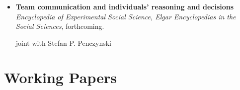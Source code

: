 \documentclass[letterpaper,11pt]{article}
\begin{document}
\begin{itemize}[leftmargin=0.15in, label=\textbullet, itemsep=5pt]
    \vspace{0.2cm}

    \item[] \begin{minipage}{\linewidth}
        \small{\textbf{Team communication and individuals' reasoning and decisions}} \\
        \small{\textit{Encyclopedia of Experimental Social Science, Elgar Encyclopedias in the Social Sciences}, forthcoming.}
        \par{\raggedleft\footnotesize{joint with Stefan P. Penczynski}\par}
    \end{minipage}

\end{itemize}
\newpage
\section{Working Papers}
\end{document}
